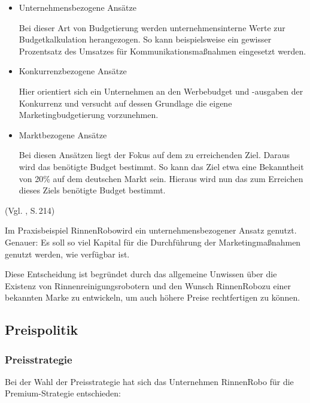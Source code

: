             \begin{itemize}
                \item Unternehmensbezogene Ansätze
                    
                    Bei dieser Art von Budgetierung werden unternehmensinterne Werte zur Budgetkalkulation herangezogen. So kann
                    beispielsweise ein gewisser Prozentsatz des Umsatzes für Kommunikationsmaßnahmen eingesetzt werden.
        
                \item Konkurrenzbezogene Ansätze
                
                    Hier orientiert sich ein Unternehmen an den Werbebudget und -ausgaben der Konkurrenz und versucht auf dessen
                    Grundlage die eigene Marketingbudgetierung vorzunehmen.
        
                \item Marktbezogene Ansätze
                
                    Bei diesen Ansätzen liegt der Fokus auf dem zu erreichenden Ziel. Daraus wird das benötigte Budget bestimmt.
                    So kann das Ziel etwa eine Bekanntheit von 20\% auf dem deutschen Markt sein. Hieraus wird nun das zum
                    Erreichen dieses Ziels benötigte Budget bestimmt.
            \end{itemize} (Vgl. \cite{Bruhn2014a}, S.\,214)
        
            \noindent
            Im Praxisbeispiel \as RinnenRobo\adl wird ein unternehmensbezogener Ansatz genutzt. Genauer: Es soll so viel
            Kapital für die Durchführung der Marketingmaßnahmen genutzt werden, wie verfügbar ist.
        
            \noindent
            Diese Entscheidung ist begründet durch das allgemeine Unwissen über die Existenz von Rinnenreinigungsrobotern und
            den Wunsch \as RinnenRobo\adl zu einer bekannten Marke zu entwickeln, um auch höhere Preise rechtfertigen zu
            können.
        
        

 \subsection{Preispolitik}

    \subsubsection{Preisstrategie} \label{preisstrat}
        Bei der Wahl der Preisstrategie hat sich das Unternehmen RinnenRobo für die Premium-Strategie entschieden:

